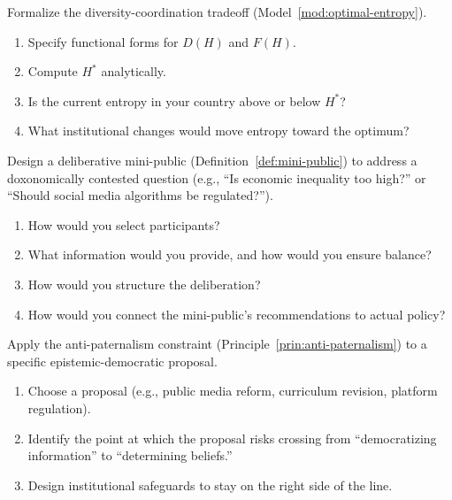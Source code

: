 \begin{exercise}
Formalize the diversity-coordination tradeoff (Model~\ref{mod:optimal-entropy}).
\begin{enumerate}[nosep]
  \item Specify functional forms for $D(H)$ and $F(H)$.
  \item Compute $H^*$ analytically.
  \item Is the current entropy in your country above or below $H^*$?
  \item What institutional changes would move entropy toward the optimum?
\end{enumerate}
\end{exercise}

\begin{exercise}
Design a deliberative mini-public (Definition~\ref{def:mini-public}) to address a doxonomically contested question (e.g., ``Is economic inequality too high?'' or ``Should social media algorithms be regulated?'').
\begin{enumerate}[nosep]
  \item How would you select participants?
  \item What information would you provide, and how would you ensure balance?
  \item How would you structure the deliberation?
  \item How would you connect the mini-public's recommendations to actual policy?
\end{enumerate}
\end{exercise}

\begin{exercise}
Apply the anti-paternalism constraint (Principle~\ref{prin:anti-paternalism}) to a specific epistemic-democratic proposal.
\begin{enumerate}[nosep]
  \item Choose a proposal (e.g., public media reform, curriculum revision, platform regulation).
  \item Identify the point at which the proposal risks crossing from ``democratizing information'' to ``determining beliefs.''
  \item Design institutional safeguards to stay on the right side of the line.
\end{enumerate}
\end{exercise}

